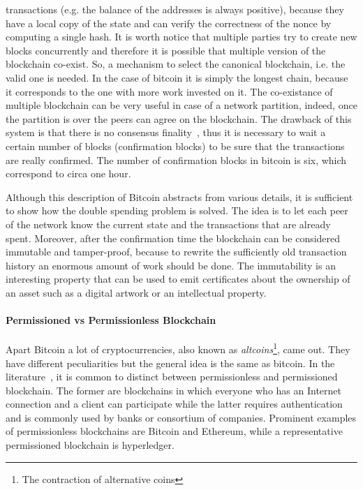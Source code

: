 transactions (e.g. the balance of the addresses is always positive), because 
they have a local copy of the state and can verify the correctness of the nonce 
by computing a single hash. It is worth notice that multiple parties try to 
create new blocks concurrently and therefore it is possible that multiple 
version of the blockchain co-exist. So, a mechanism to select the canonical 
blockchain, i.e. the valid one is needed. In the case of bitcoin it is simply 
the longest chain, because it corresponds to the one with more work invested on 
it. The co-existance of multiple blockchain can be very useful in case of a 
network partition, indeed, once the partition is over the peers can agree on 
the blockchain. The drawback of this system is that there is no consensus 
finality~\cite{bib:the-quest}, thus it is necessary to wait a certain number of 
blocks (confirmation blocks) to be sure that the transactions are really 
confirmed. The number of confirmation blocks in bitcoin is six, which 
correspond to circa one hour.

Although this description of Bitcoin abstracts from various details, it is
sufficient to show how the double spending problem is solved. The idea is to
let each peer of the network know the current state and the transactions that 
are already spent. Moreover, after the confirmation time the blockchain can be
considered immutable and tamper-proof, because to rewrite the sufficiently old
transaction history an enormous amount of work should be done. The immutability
is an interesting property that can be used to emit certificates about the
ownership of an asset such as a digital artwork or an intellectual property.

\paragraph{Permissioned vs Permissionless Blockchain}
Apart Bitcoin a lot of cryptocurrencies, also known as 
\emph{altcoins}\footnote{The contraction of alternative coins}, came out.
They have different peculiarities but the general idea is the same as bitcoin.
In the literature~\cite{bib:the-quest}, it is common to distinct between 
permissionless and permissioned blockchain. The former are blockchains in which 
everyone who has an Internet connection and a client can participate while the 
latter requires authentication and is commonly used by banks or consortium of 
companies. Prominent examples of permissionless blockchains are Bitcoin and 
Ethereum, while a representative permissioned blockchain is hyperledger.


